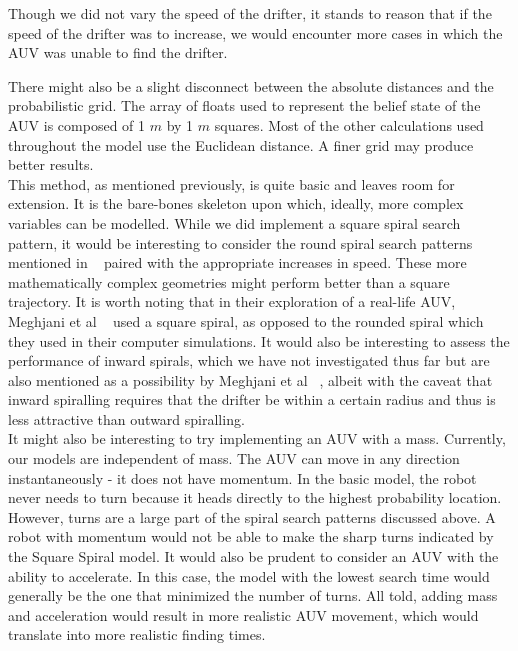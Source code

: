 \documentclass[a4paper, 11pt]{article} %
\begin{document}
\noindent Though we did not vary the speed of the drifter, it stands to reason that if the speed of the drifter was to increase, we would encounter more cases in which the AUV was unable to find the drifter.

\noindent There might also be a slight disconnect between the absolute distances and the probabilistic grid. The array of floats used to represent the belief state of the AUV is composed of 1 $m$ by 1 $m$ squares. Most of the other calculations used throughout the model use the Euclidean distance. A finer grid may produce better results. \\

\noindent This method, as mentioned previously, is quite basic and leaves room for extension. It is the bare-bones skeleton upon which, ideally, more complex variables can be modelled. While we did implement a square spiral search pattern, it would be interesting to consider the round spiral search patterns mentioned in ~\cite{meghjani14} paired with the appropriate increases in speed. These more mathematically complex geometries might perform better than a square trajectory. It is worth noting that in their exploration of a real-life AUV, Meghjani et al ~\cite{meghjani14} used a square spiral, as opposed to the rounded spiral which they used in their computer simulations. It would also be interesting to assess the performance of inward spirals, which we have not investigated thus far but are also mentioned as a possibility by Meghjani et al ~\cite{meghjani14}, albeit with the caveat that inward spiralling requires that the drifter be within a certain radius and thus is less attractive than outward spiralling.\\

\noindent It might also be interesting to try implementing an AUV with a mass. Currently, our models are independent of mass. The AUV can move in any direction instantaneously - it does not have momentum. In the basic model, the robot never needs to turn because it heads directly to the highest probability location. However, turns are a large part of the spiral search patterns discussed above. A robot with momentum would not be able to make the sharp turns indicated by the Square Spiral model. It would also be prudent to consider an AUV with the ability to accelerate. In this case, the model with the lowest search time would generally be the one that minimized the number of turns. All told, adding mass and acceleration would result in more realistic AUV movement, which would translate into more realistic finding times.\\
\end{document}
